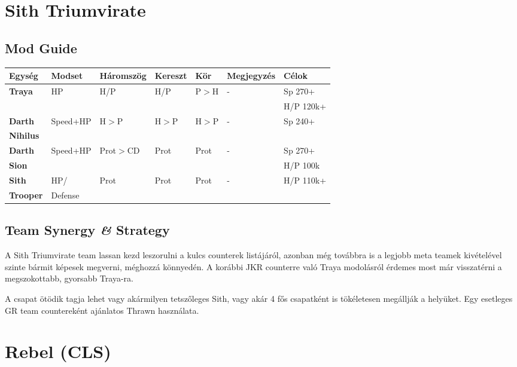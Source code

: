 \documentclass[11pt]{report}
\begin{document}
\chapter{Sith Triumvirate}
\section{Mod Guide}
\begin{center}
    \begin{tabular}{|l | l | l | l | l | l | l |}
        \hline
        Egység & Modset & Háromszög & Kereszt & Kör & Megjegyzés & Célok\\ \hline
        \textbf{Traya} & HP & H/P & H/P & P$>$H & - & Sp 270+\\
        &  &  &  &  &  & H/P 120k+ \\ \hline
        \textbf{Darth} & Speed+HP & H$>$P & H$>$P & H$>$P & - & Sp 240+\\
        \textbf{Nihilus} &  &  &  &  &  & \\ \hline
        \textbf{Darth} & Speed+HP & Prot$>$CD & Prot & Prot & - & Sp 270+\\
        \textbf{Sion} &  &  &  &  &  & H/P 100k\\ \hline
        \textbf{Sith} & HP/ & Prot & Prot & Prot & - & H/P 110k+\\
        \textbf{Trooper} & Defense &  &  &  &  & \\ \hline              
    \end{tabular}
\end{center}
\section{Team Synergy \textit{\&} Strategy}
A Sith Triumvirate team lassan kezd leszorulni a kulcs counterek listájáról, azonban még továbbra is a legjobb meta teamek kivételével szinte bármit képesek megverni, méghozzá könnyedén. A korábbi JKR counterre való Traya modolásról érdemes most már visszatérni a megszokottabb, gyorsabb Traya-ra.\par
A csapat ötödik tagja lehet vagy akármilyen tetszőleges Sith, vagy akár 4 fős csapatként is tökéletesen megállják a helyüket. Egy esetleges GR team countereként ajánlatos Thrawn használata.


\chapter{Rebel (CLS)}
\end{document}
